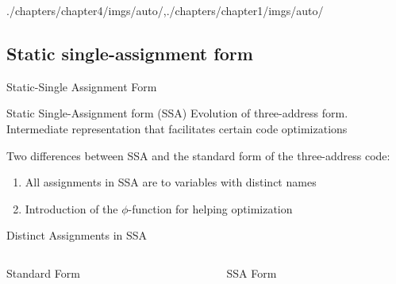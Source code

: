 \begin{graphicspathcontext}{{./chapters/chapter4/imgs/auto/},{./chapters/chapter1/imgs/auto/}}
\begin{bibunit}[apalike]
\subsection{Static single-assignment form}
\subsectiontableofcontentslide

\begin{frame}{{Static-Single Assignment} Form}
	\begin{definitionblock}{Static Single-Assignment form (SSA)}
		Evolution of three-address form. \newline
		Intermediate representation that facilitates certain code optimizations
	\end{definitionblock}
	\vspace{3em}
	Two differences between SSA and the standard form of the three-address code:
	\begin{enumerate}
	\item All assignments in SSA are to variables with distinct names
	\item Introduction of the $\phi$-function for helping optimization
	\end{enumerate}
\end{frame}

\begin{frame}[background=8]{{Distinct Assignments} in SSA}
	\vspace{.25cm}
	\begin{columns}
		\begin{column}{.5\linewidth}
			\begin{center}
			\begin{tac}[\linewidth]
			\end{tac}
			\vspace{1em}
			Standard Form
			\end{center}
		\end{column}
		\begin{column}{.5\linewidth}
			\begin{center}
			\begin{tac}[\linewidth]
			\end{tac}
			\vspace{1em}
			SSA Form
			\end{center}
		\end{column}
	\end{columns}
\end{frame}


\end{bibunit}
\end{graphicspathcontext}
